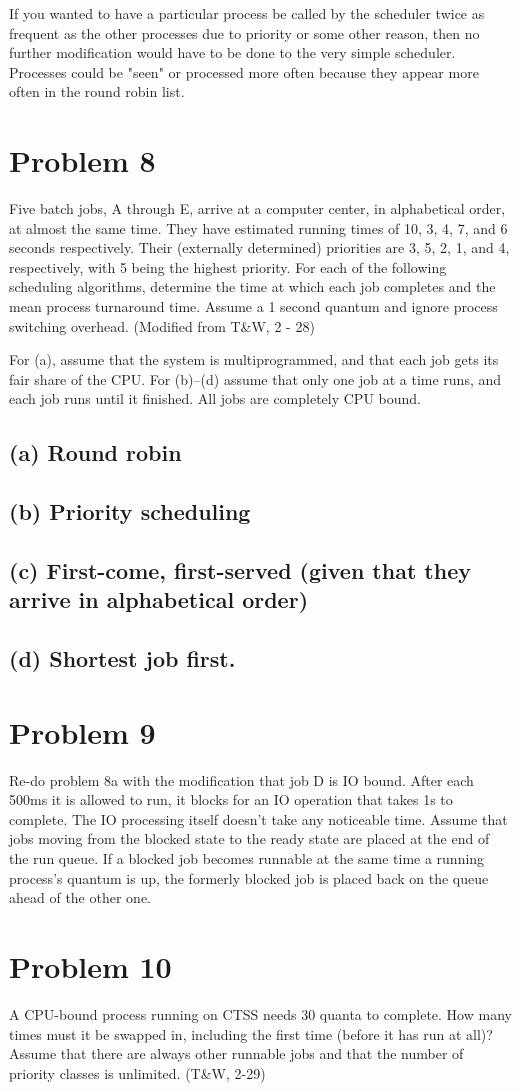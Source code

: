 \documentclass[11pt]{article}
\begin{document}
If you wanted to have a particular process be called by the scheduler twice as frequent as the other processes due to priority or some other reason, then no further modification would have to be done to the very simple scheduler. Processes could be "seen" or processed more often because they appear more often in the round robin list.

\section*{Problem 8}
Five batch jobs, A through E, arrive at a computer center, in alphabetical order, at almost the same time. They have estimated running times of 10, 3, 4, 7, and 6 seconds respectively. Their (externally determined) priorities are 3, 5, 2, 1, and 4, respectively, with 5 being the highest priority. For each of the following scheduling algorithms, determine the time at which each job completes and the mean process turnaround time. Assume a 1 second quantum and ignore process switching overhead. (Modified from T\&W, 2 - 28)

For (a), assume that the system is multiprogrammed, and that each job gets its fair share of the CPU. For (b)–(d) assume that only one job at a time runs, and each job runs until it finished. All jobs are completely CPU bound.

\subsection*{(a) Round robin}


\subsection*{(b) Priority scheduling}


\subsection*{(c) First-come, first-served (given that they arrive in alphabetical order)}


\subsection*{(d) Shortest job first.}


\section*{Problem 9}
Re-do problem 8a with the modification that job D is IO bound. After each 500ms it is allowed to run, it blocks for an IO operation that takes 1s to complete. The IO processing itself doesn’t take any noticeable time. Assume that jobs moving from the blocked state to the ready state are placed at the end of the run queue. If a blocked job becomes runnable at the same time a running process’s quantum is up, the formerly blocked job is placed back on the queue ahead of the other one.



\section*{Problem 10}
A CPU-bound process running on CTSS needs 30 quanta to complete. How many times must it be swapped in, including the first time (before it has run at all)? Assume that there are always other runnable jobs and that the number of priority classes is unlimited. (T\&W, 2-29)
\end{document}
